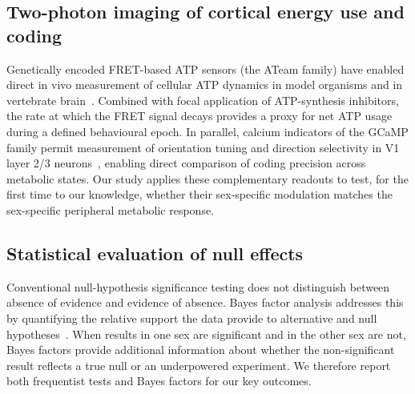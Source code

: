 \subsection{Two-photon imaging of cortical energy use and coding}
Genetically encoded FRET-based ATP sensors (the ATeam family) have enabled direct in vivo measurement of cellular ATP dynamics in model organisms and in vertebrate brain~\cite{imamura2009visualization,tsuyama2013ateam,ando2012visualization,kishikawa2011ateam}. Combined with focal application of ATP-synthesis inhibitors, the rate at which the FRET signal decays provides a proxy for net ATP usage during a defined behavioural epoch. In parallel, calcium indicators of the GCaMP family permit measurement of orientation tuning and direction selectivity in V1 layer 2/3 neurons~\cite{petousakis2023apical,mcclure2019puretones}, enabling direct comparison of coding precision across metabolic states. Our study applies these complementary readouts to test, for the first time to our knowledge, whether their sex-specific modulation matches the sex-specific peripheral metabolic response.

\subsection{Statistical evaluation of null effects}
Conventional null-hypothesis significance testing does not distinguish between absence of evidence and evidence of absence. Bayes factor analysis addresses this by quantifying the relative support the data provide to alternative and null hypotheses~\cite{sekulovski2024bayes}. When results in one sex are significant and in the other sex are not, Bayes factors provide additional information about whether the non-significant result reflects a true null or an underpowered experiment. We therefore report both frequentist tests and Bayes factors for our key outcomes.
